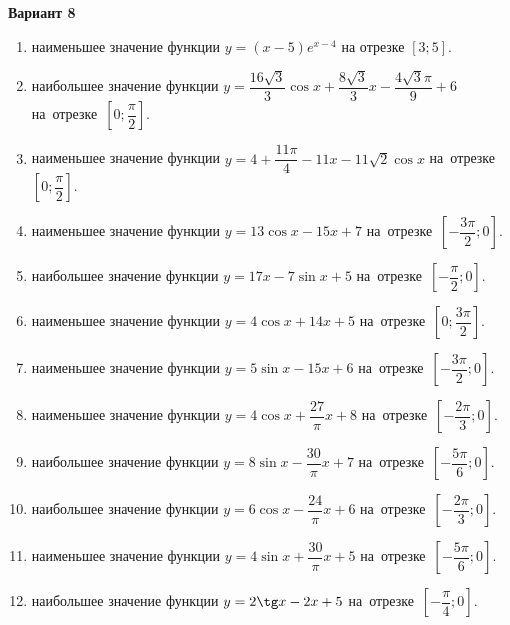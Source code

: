 \documentclass[a4paper,10pt]{article}
\begin{document}
\begin{center}\Large\textbf{Вариант 8}\end{center}

\begin{enumerate}
\item {} наименьшее значение функции $y=\left(x-5\right)e^{x-4}$ на отрезке $\left[3;5\right]$.

\item {} наибольшее значение функции $y=\dfrac{16\sqrt{3}}{3}\cos x+\dfrac{8\sqrt{3}}{3}x-\dfrac{4\sqrt{3}\pi }{9}+6$ на~отрезке~$\left[0;\dfrac{\pi }{2}\right]$.

\item {} наименьшее значение функции $y=4+\dfrac{11\pi }{4}-11x-11\sqrt{2}\cos x$ на~отрезке~$\left[0;\dfrac{\pi }{2}\right]$.

\item {} наименьшее значение функции $y=13\cos x-15x+7$ на~отрезке~$\left[-\dfrac{3\pi }{2};0\right]$.

\item {} наибольшее значение функции $y=17x-7\sin x+5$ на~отрезке~$\left[-\dfrac{\pi }{2};0\right]$.

\item {} наименьшее значение функции $y=4\cos x+14x+5$ на~отрезке~$\left[0;\dfrac{3\pi }{2}\right]$.

\item {} наименьшее значение функции $y=5\sin x-15x+6$ на~отрезке~$\left[-\dfrac{3\pi }{2};0\right]$.

\item {} наименьшее значение функции $y=4\cos x+\dfrac{27}{\pi }x+8$ на~отрезке~$\left[-\dfrac{2\pi }{3};0\right]$.

\item {} наибольшее значение функции $y=8\sin x-\dfrac{30}{\pi }x+7$ на~отрезке~$\left[-\dfrac{5\pi }{6};0\right]$.

\item {} наибольшее значение функции $y=6\cos x-\dfrac{24}{\pi }x+6$ на~отрезке~$\left[-\dfrac{2\pi }{3};0\right]$.

\item {} наименьшее значение функции $y=4\sin x+\dfrac{30}{\pi }x+5$ на~отрезке~$\left[-\dfrac{5\pi }{6};0\right]$.

\item {} наибольшее значение функции $y=2\tg x-2x+5$ на~отрезке~$\left[-\dfrac{\pi }{4};0\right]$.


\end{enumerate}
\end{document}
